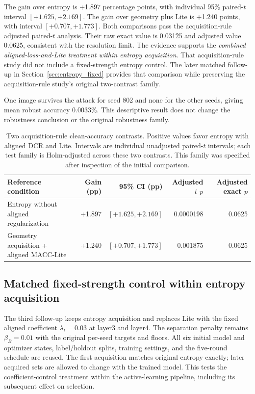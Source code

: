 \documentclass[10pt,a4paper,twocolumn]{article}
\begin{document}
The gain over entropy is +1.897 percentage points, with individual
95\% paired-$t$ interval $[+1.625,+2.169]$. The gain over geometry plus
Lite is +1.240 points, with interval $[+0.707,+1.773]$. Both comparisons
pass the acquisition-rule adjusted paired-$t$ analysis. Their raw exact value is 0.03125 and adjusted value
0.0625, consistent with the resolution limit.
The evidence supports the \emph{combined aligned-loss-and-Lite
treatment within entropy acquisition}.
That acquisition-rule study did not include a fixed-strength entropy
control. The later matched follow-up in Section~\ref{sec:entropy_fixed}
provides that comparison while preserving the acquisition-rule study's
original two-contrast family.

One image survives the attack for seed 802 and none for the
other seeds, giving mean robust accuracy $0.0033\%$.
This descriptive result does not change the robustness
conclusion or the original robustness family.


\begin{table}[tbp]
\caption{Two acquisition-rule clean-accuracy contrasts.
Positive values favor entropy with aligned DCR and Lite.
Intervals are individual unadjusted paired-$t$ intervals;
each test family is Holm-adjusted across these two contrasts.
This family was specified after inspection of the initial comparison.}
\label{tab:entropy_lite_supplement}
\centering\small
\begin{tabularx}{\textwidth}{@{}Yrrrr@{}}
\toprule
Reference condition & Gain (pp) & 95\% CI (pp) &
Adjusted $t$ $p$ & Adjusted exact $p$ \\
\midrule
Entropy without aligned regularization &
+1.897 & $[+1.625,+2.169]$ & 0.0000198 & 0.0625 \\
Geometry acquisition + aligned MACC-Lite &
+1.240 & $[+0.707,+1.773]$ & 0.001875 & 0.0625 \\
\bottomrule
\end{tabularx}
\end{table}


\subsection{Matched fixed-strength control within entropy acquisition}\label{sec:fixed_results}
\label{sec:entropy_fixed}

The third follow-up keeps entropy acquisition and replaces Lite with
the fixed aligned coefficient $\lambda_l=0.03$ at layer3 and layer4.
The separation penalty remains $\beta_B=0.01$ with the original
per-seed targets and floors. All six initial model and optimizer states,
label/holdout splits, training settings, and the five-round schedule are
reused. The first acquisition matches original entropy exactly; later
acquired sets are allowed to change with the trained model. This tests
the coefficient-control treatment within the active-learning pipeline,
including its subsequent effect on selection.
\end{document}
